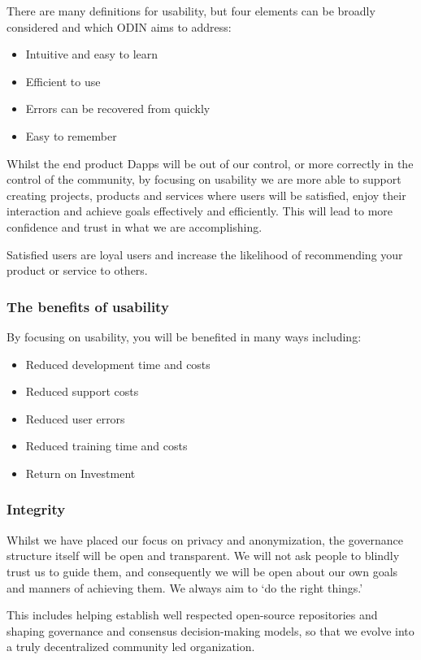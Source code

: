 \documentclass[12pt,letterpaper]{article}
\begin{document}
There are many definitions for usability, but four elements can be broadly considered and which ODIN aims to address:
\begin{itemize}
   \item Intuitive and easy to learn
   \item Efficient to use
   \item Errors can be recovered from quickly
   \item Easy to remember
\end{itemize}
    
Whilst the end product Dapps will be out of our control, or more correctly in the control of the community, by focusing on usability we are more able to support creating projects, products and services where users will be satisfied, enjoy their interaction and achieve goals effectively and efficiently.  This will lead to more confidence and trust in what we are accomplishing.

Satisfied users are loyal users and increase the likelihood of recommending your product or service to others.

\subsubsection{The benefits of usability}
By focusing on usability, you will be benefited in many ways including:
\begin{itemize}
   \item Reduced development time and costs
   \item Reduced support costs
   \item Reduced user errors
   \item Reduced training time and costs
   \item Return on Investment
\end{itemize}

\subsubsection{​Integrity}

Whilst we have placed our focus on privacy and anonymization, the governance structure itself will be open and transparent. We will not ask people to blindly trust us to guide them, and consequently we will be open about our own goals and manners of achieving them. We always aim to `do the right things.'

This includes helping establish well respected open-source repositories and shaping governance and consensus decision-making models, so that we evolve into a truly decentralized community led organization.
\end{document}
